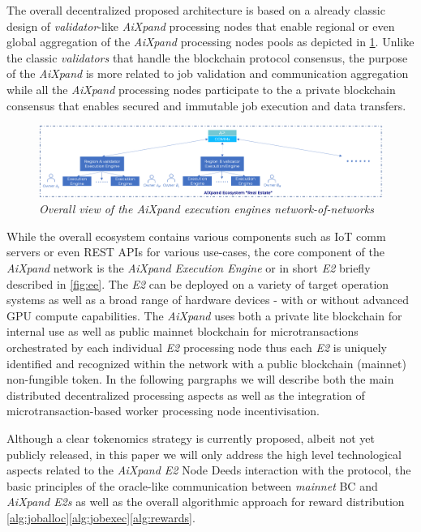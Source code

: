 \documentclass{article}
\begin{document}
The overall decentralized proposed architecture is based on a already classic design of \textit{validator}-like \textit{AiXpand} processing nodes that enable regional or even global aggregation of the \textit{AiXpand}  processing nodes pools as depicted in \figurename{\ref{fig:aixp_overall}}. Unlike the classic \textit{validators} that handle the blockchain protocol consensus, the purpose of the \textit{AiXpand} is more related to job validation and communication aggregation while all the \textit{AiXpand} processing nodes participate to the a private blockchain consensus that enables secured and immutable job execution and data transfers.
\begin{figure}[htp]
    \centering
    \includegraphics[width=16cm]{aixp_overall.png}
    \caption{\textit{Overall view of the AiXpand execution engines network-of-networks}}
    \label{fig:aixp_overall}
\end{figure}

While the overall ecosystem contains various components such as IoT comm servers or even REST APIs for various use-cases, the core component of the \textit{AiXpand} network is the \textit{AiXpand Execution Engine} or in short \textit{E2} briefly described in \figurename{\ref{fig:ee}}. The \textit{E2} can be deployed on a variety of target operation systems as well as a broad range of hardware devices - with or without advanced GPU compute capabilities. The \textit{AiXpand} uses both a private lite blockchain for internal use as well as public mainnet blockchain for microtransactions orchestrated by each individual \textit{E2} processing node thus each  \textit{E2} is uniquely identified and recognized within the network with a public blockchain (mainnet) non-fungible token. In the following pargraphs we will describe both the main distributed decentralized processing aspects as well as the integration of microtransaction-based worker processing node incentivisation. 

Although a clear tokenomics strategy is currently proposed, albeit not yet publicly released, in this paper we will only address the high level technological aspects related to the \textit{AiXpand E2} Node Deeds interaction with the protocol, the basic principles of the oracle-like communication between \textit{mainnet} BC and \textit{AiXpand E2s} as well as the overall algorithmic approach for reward distribution \ref{alg:joballoc}\ref{alg:jobexec}\ref{alg:rewards}.
\end{document}
